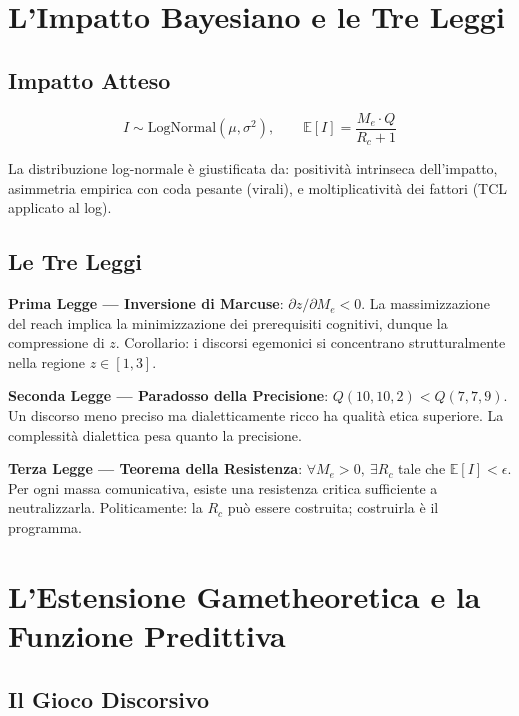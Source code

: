 \section{L'Impatto Bayesiano e le Tre
Leggi}\label{limpatto-bayesiano-e-le-tre-leggi}

\subsection{Impatto Atteso}\label{impatto-atteso}

\[
I \sim \mathrm{LogNormal}(\mu, \sigma^2), \qquad \mathbb{E}[I] = \frac{M_e \cdot Q}{R_c + 1}
\]

La distribuzione log-normale è giustificata da: positività intrinseca
dell'impatto, asimmetria empirica con coda pesante (virali), e
moltiplicatività dei fattori (TCL applicato al log).

\subsection{Le Tre Leggi}\label{le-tre-leggi}

\Proved{} \textbf{Prima Legge --- Inversione di Marcuse}:
\(\partial z / \partial M_e < 0\). La massimizzazione del reach implica
la minimizzazione dei prerequisiti cognitivi, dunque la compressione di
\(z\). Corollario: i discorsi egemonici si concentrano strutturalmente
nella regione \(z \in [1, 3]\).

\Proved{} \textbf{Seconda Legge --- Paradosso della Precisione}:
\(Q(10, 10, 2) < Q(7, 7, 9)\). Un discorso meno preciso ma
dialetticamente ricco ha qualità etica superiore. La complessità
dialettica pesa quanto la precisione.

\Proved{} \textbf{Terza Legge --- Teorema della Resistenza}:
\(\forall M_e > 0,\ \exists R_c\) tale che \(\mathbb{E}[I] < \epsilon\).
Per ogni massa comunicativa, esiste una resistenza critica sufficiente a
neutralizzarla. Politicamente: la \(R_c\) può essere costruita;
costruirla è il programma.



\section{L'Estensione Gametheoretica e la Funzione
Predittiva}\label{lestensione-gametheoretica-e-la-funzione-predittiva}

\subsection{Il Gioco Discorsivo}\label{il-gioco-discorsivo}

